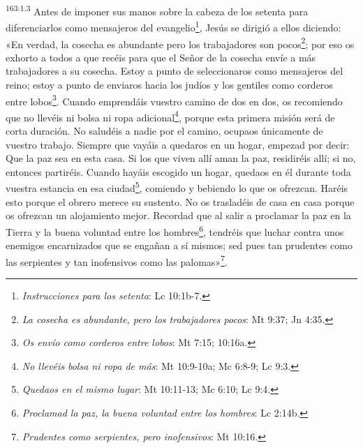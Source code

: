 \par
\textsuperscript{163:1.3} Antes de imponer sus manos sobre la cabeza de los setenta para diferenciarlos como mensajeros del evangelio\footnote{\textit{Instrucciones para los setenta}: Lc 10:1b-7.}, Jesús se dirigió a ellos diciendo: «En verdad, la cosecha es abundante pero los trabajadores son pocos\footnote{\textit{La cosecha es abundante, pero los trabajadores pocos}: Mt 9:37; Jn 4:35.}; por eso os exhorto a todos a que recéis para que el Señor de la cosecha envíe a más trabajadores a su cosecha. Estoy a punto de seleccionaros como mensajeros del reino; estoy a punto de enviaros hacia los judíos y los gentiles como corderos entre lobos\footnote{\textit{Os envío como corderos entre lobos}: Mt 7:15; 10:16a.}. Cuando emprendáis vuestro camino de dos en dos, os recomiendo que no llevéis ni bolsa ni ropa adicional\footnote{\textit{No llevéis bolsa ni ropa de más}: Mt 10:9-10a; Mc 6:8-9; Lc 9:3.}, porque esta primera misión será de corta duración. No saludéis a nadie por el camino, ocupaos únicamente de vuestro trabajo. Siempre que vayáis a quedaros en un hogar, empezad por decir: Que la paz sea en esta casa. Si los que viven allí aman la paz, residiréis allí; si no, entonces partiréis. Cuando hayáis escogido un hogar, quedaos en él durante toda vuestra estancia en esa ciudad\footnote{\textit{Quedaos en el mismo lugar}: Mt 10:11-13; Mc 6:10; Lc 9:4.}, comiendo y bebiendo lo que os ofrezcan. Haréis esto porque el obrero merece su sustento. No os trasladéis de casa en casa porque os ofrezcan un alojamiento mejor. Recordad que al salir a proclamar la paz en la Tierra y la buena voluntad entre los hombres\footnote{\textit{Proclamad la paz, la buena voluntad entre los hombres}: Lc 2:14b.}, tendréis que luchar contra unos enemigos encarnizados que se engañan a sí mismos; sed pues tan prudentes como las serpientes y tan inofensivos como las palomas»\footnote{\textit{Prudentes como serpientes, pero inofensivos}: Mt 10:16.}.

